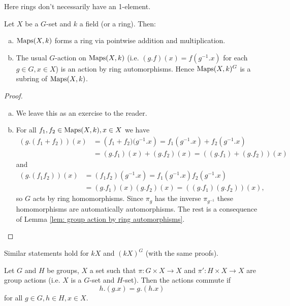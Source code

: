 \begin{rem}
 Here rings don't necessarily have an 1-element.
\end{rem}


\begin{expl}
 Let $X$ be a $G$-set and $k$ a field (or a ring). Then:
 \begin{enumerate}[a)]
  \item
   $\operatorname{Maps}(X,k)$ forms a ring via pointwise addition and multiplication.
  \item
   The usual $G$-action on $\operatorname{Maps}(X,k)$ (i.e. $(g.f)(x) = f(g^{-1}.x)$ for each $g \in G, x \in X$) is an action by ring automorphisms. Hence $\operatorname{Maps}(X,k)^G$ is a subring of $\operatorname{Maps}(X,k)$.
 \end{enumerate}
 \begin{proof}
  \begin{enumerate}[a)]
   \item
    We leave this as an exercise to the reader.
   \item
    For all $f_1, f_2 \in \operatorname{Maps}(X,k), x \in X$ we have
    \begin{align*}
     (g.(f_1+f_2))(x) &= \left(f_1+f_2)(g^{-1}.x\right) = f_1\left(g^{-1}.x\right) + f_2\left(g^{-1}.x\right) \\
     &= (g.f_1)(x) + (g.f_2)(x) = ((g.f_1)+(g.f_2))(x)
    \end{align*}
    and
    \begin{align*}
     (g.(f_1 f_2))(x) &= (f_1 f_2)\left(g^{-1}.x\right) = f_1\left(g^{-1}.x\right) f_2\left(g^{-1}.x\right) \\
     &= (g.f_1)(x) (g.f_2)(x) = ((g.f_1)(g.f_2))(x),
    \end{align*}
    so $G$ acts by ring homomorphisms. Since $\pi_g$ has the inverse $\pi_{g^{-1}}$ these homomorphisms are automatically automorphisms. The rest is a consequence of Lemma \ref{lem: group action by ring automorphisms}.
  \end{enumerate}
 \end{proof}
\end{expl}


\begin{rem}
 Similar statements hold for $kX$ and $(kX)^G$ (with the same proofs).
\end{rem}


\begin{defi}
 Let $G$ and $H$ be groups, $X$ a set such that $\pi : G \times X \to X$ and $\pi' : H \times X \to X$ are group actions (i.e. $X$ is a $G$-set and $H$-set). Then the actions commute if
 \[
  h.(g.x) = g.(h.x)
 \]
 for all $g \in G, h \in H, x \in X$.
\end{defi}


